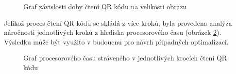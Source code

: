  \begin{figure}[H]
  \begin{center}
    \caption{Graf závislosti doby čtení QR kódu na velikosti obrazu}
    \label{decodeFPS}
  \end{center}
\end{figure}

Jelikož proces čtení QR kódu se skládá z více kroků, byla provedena analýza
náročnosti jednotlivých kroků z hlediska procesorového času
(obrázek \ref{decodingStepsOverview}). Výsledku může být využito v budoucnu pro návrh
případných optimalizací.

 \begin{figure}[H]
  \begin{center}
    \caption{Graf procesorového času stráveného v jednotlivých
    krocích čtení QR kódu}
    \label{decodingStepsOverview}
  \end{center}
\end{figure}

